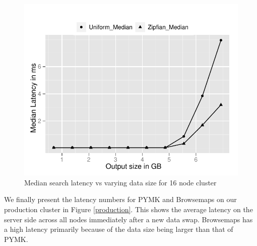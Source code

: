 \begin{figure}
  \centering
    \includegraphics[scale=0.55]{images/search_16node.pdf}
  \caption{Median search latency vs varying data size for 16 node cluster}
  \label{16search}
\end{figure}


We finally present the latency numbers for PYMK and Browsemaps on our production cluster in Figure \ref{production}. This shows the average latency on the server side across all nodes immediately after a new data swap. Browsemaps has a high latency primarily because of the data size being larger than that of PYMK.

